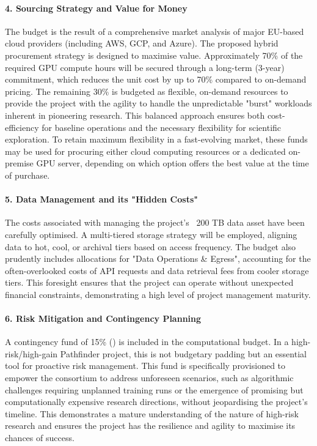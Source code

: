 \paragraph{4. Sourcing Strategy and Value for Money}
The budget is the result of a comprehensive market analysis of major EU-based cloud providers (including AWS, GCP, and Azure). The proposed hybrid procurement strategy is designed to maximise value. Approximately 70\% of the required GPU compute hours will be secured through a long-term (3-year) commitment, which reduces the unit cost by up to 70\% compared to on-demand pricing. The remaining 30\% is budgeted as flexible, on-demand resources to provide the project with the agility to handle the unpredictable "burst" workloads inherent in pioneering research. This balanced approach ensures both cost-efficiency for baseline operations and the necessary flexibility for scientific exploration. To retain maximum flexibility in a fast-evolving market, these funds may be used for procuring either cloud computing resources or a dedicated on-premise GPU server, depending on which option offers the best value at the time of purchase.

\paragraph{5. Data Management and its "Hidden Costs"}
The costs associated with managing the project's ~200 TB data asset have been carefully optimised. A multi-tiered storage strategy will be employed, aligning data to hot, cool, or archival tiers based on access frequency. The budget also prudently includes allocations for "Data Operations \& Egress", accounting for the often-overlooked costs of API requests and data retrieval fees from cooler storage tiers. This foresight ensures that the project can operate without unexpected financial constraints, demonstrating a high level of project management maturity.

\paragraph{6. Risk Mitigation and Contingency Planning}
A contingency fund of 15\% () is included in the computational budget. In a high-risk/high-gain Pathfinder project, this is not budgetary padding but an essential tool for proactive risk management. This fund is specifically provisioned to empower the consortium to address unforeseen scenarios, such as algorithmic challenges requiring unplanned training runs or the emergence of promising but computationally expensive research directions, without jeopardising the project's timeline. This demonstrates a mature understanding of the nature of high-risk research and ensures the project has the resilience and agility to maximise its chances of success.

